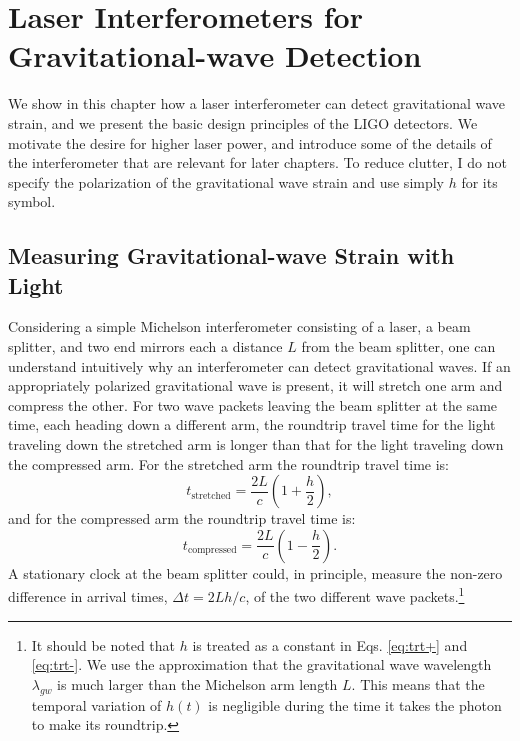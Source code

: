 \chapter{Laser Interferometers for Gravitational-wave Detection}

We show in this chapter how a laser interferometer can detect
gravitational wave strain, and we present the basic design principles
of the LIGO detectors. We motivate the desire for higher laser power,
and introduce some of the details of the interferometer that are
relevant for later chapters. To reduce clutter, I do not specify the
polarization of the gravitational wave strain and use simply $h$ for
its symbol.


\section{Measuring Gravitational-wave Strain with Light}
Considering a simple Michelson interferometer consisting of a laser, a
beam splitter, and two end mirrors each a distance $L$ from the beam
splitter, one can understand intuitively why an interferometer can
detect gravitational waves. If an appropriately polarized
gravitational wave is present, it will stretch one arm and compress
the other. For two wave packets leaving the beam splitter at the same
time, each heading down a different arm, the roundtrip travel time for
the light traveling down the stretched arm is longer than that for the
light traveling down the compressed arm. For the stretched arm the
roundtrip travel time is:
\begin{equation}
t_{\mathrm{stretched}} = \frac{2 L}{c} \left( 1 + \frac{h}{2} \right),
\label{eq:trt+} 
\end{equation}
and for the compressed arm the roundtrip travel time is:
\begin{equation}
t_{\mathrm{compressed}} = \frac{2 L}{c} \left( 1 - \frac{h}{2} \right).
\label{eq:trt-} 
\end{equation}
A stationary clock at the beam splitter could, in principle, measure
the non-zero difference in arrival times, $\Delta t = 2Lh/c$, of the
two different wave packets.\footnote{It should be noted that $h$ is
  treated as a constant in Eqs. \ref{eq:trt+} and \ref{eq:trt-}. We
  use the approximation that the gravitational wave wavelength
  $\lambda_{gw}$ is much larger than the Michelson arm length
  $L$. This means that the temporal variation of $h(t)$ is negligible
  during the time it takes the photon to make its roundtrip.}

